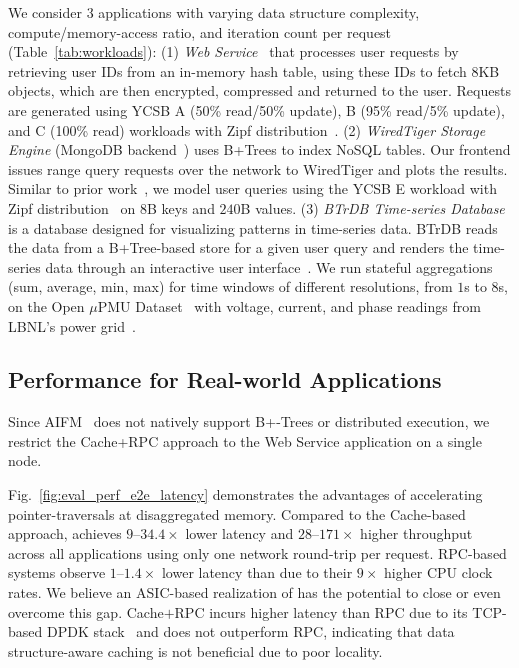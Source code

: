  We consider $3$ applications with varying data structure complexity, compute/memory-access ratio, and iteration count per request (Table~\ref{tab:workloads}): (1) \textit{Web Service}~\cite{aifm} that processes user requests by retrieving user IDs from an in-memory hash table, using these IDs to fetch 8KB objects, which are then encrypted, compressed and returned to the user. Requests are generated using YCSB A (50\% read/50\% update), B (95\% read/5\% update), and C (100\% read) workloads with Zipf distribution~\cite{ycsb_workload}. (2) \textit{WiredTiger Storage Engine} (MongoDB backend~\cite{mongodb}) uses B+Trees to index NoSQL tables. Our frontend issues range query requests over the network to WiredTiger and plots the results. Similar to prior work~\cite{aifm, xrp}, we model user queries using the YCSB E workload with Zipf distribution~\cite{ycsb_workload} on $8$B keys and $240$B values. (3) \textit{BTrDB Time-series Database}~\cite{btrdb} is a database designed for visualizing patterns in time-series data. BTrDB reads the data from a B+Tree-based store for a given user query and renders the time-series data through an interactive user interface~\cite{mrplotter}. We run stateful aggregations (sum, average, min, max) for time windows of different resolutions, from $1$s to $8$s, on the Open $\mu$PMU Dataset~\cite{upmu} with voltage, current, and phase readings from LBNL’s power grid~\cite{btrdb}.




\subsection{Performance for Real-world Applications} 
\label{ssec:pulseapplication-study}


Since AIFM~\cite{aifm} does not natively support B+-Trees or distributed execution, we restrict the Cache+RPC approach to the Web Service application on a single node.

 Fig.~\ref{fig:eval_perf_e2e_latency} demonstrates the advantages of accelerating pointer-traversals at disaggregated memory. Compared to the Cache-based approach, \pulse achieves $9$--$34.4\times$ lower latency and $28$--$171\times$ higher throughput across all applications using only one network round-trip per request. RPC-based systems observe $1$--$1.4\times$ lower latency than \pulse due to their $9\times$ higher CPU clock rates. We believe an ASIC-based realization of \pulse has the potential to close or even overcome this gap. Cache$+$RPC incurs higher latency than RPC due to its TCP-based DPDK stack~\cite{ousterhout_shenango_19_nsdi, aifm} and does not outperform RPC, indicating that data structure-aware caching is not beneficial due to poor locality.

